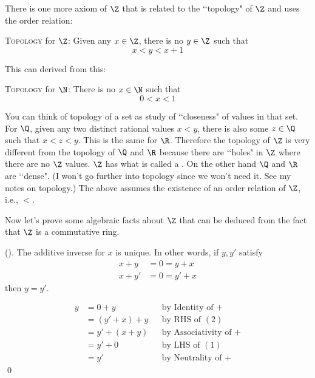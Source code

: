 There is one more axiom of $\Z$ that is related to the
\lq\lq topology" of $\Z$ and uses the order relation:

\begin{enumerate}[nosep]
  \li \textsc{Topology} for $\Z$:
  Given any $x \in \Z$, there is no $y \in \Z$ such that
  \[
  x < y < x + 1
  \]
\end{enumerate}

This can derived from this:

\begin{enumerate}[nosep]
  \li \textsc{Topology} for $\N$:
  There is no $x \in \N$ such that
  \[
  0 < x < 1
  \]
\end{enumerate}

You can think of topology of a set as study of \lq\lq closeness" of values
in that set.
For $\Q$, given any two distinct
rational values $x < y$, there is also some $z \in \Q$ such that
$x < z < y$.
This is the same for $\R$.
Therefore the topology of $\Z$ is very different from the topology
of $\Q$ and $\R$ because there are \lq\lq holes" in $\Z$ where
there are no $\Z$ values.
$\Z$ has what is called a .
On the other hand $\Q$ and $\R$ are \lq\lq dense".
(I won't go further into topology since we won't need it.
See my notes on topology.)
The above assumes the existence of an order relation of $\Z$, i.e., $<$.

Now let's prove some algebraic facts about $\Z$ that can be deduced
from the fact that $\Z$ is a commutative ring.

\begin{prop}
\label{prop:Z-uniqueness-of-additive-inverse}
\textnormal{()}.
  The additive inverse for $x$ is unique.
  In other words, if $y, y'$ satisfy
  \begin{align*}
    x + y &= 0 = y + x \tag{$1$}\\
    x + y' &= 0 = y' + x \tag{$2$}
  \end{align*}
  then $y = y'$.
\end{prop}
\proof
\begin{align*}
y &= 0 + y        & & \text{by Identity of $+$} \\
  &= (y' + x) + y & & \text{by RHS of $(2)$} \\
  &= y' + (x + y) & & \text{by Associativity of $+$} \\
  &= y' + 0       & & \text{by LHS of $(1)$} \\
  &= y'           & & \text{by Neutrality of $+$}
\end{align*}
\qed

